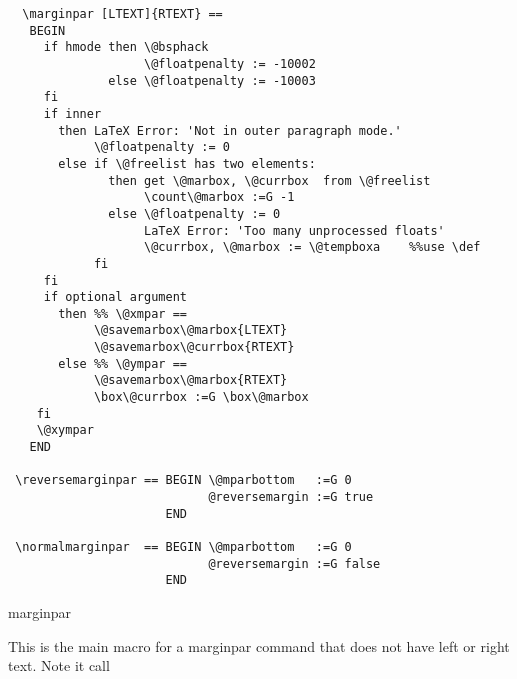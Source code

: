 \begin{verbatim}
  \marginpar [LTEXT]{RTEXT} ==
   BEGIN
     if hmode then \@bsphack
                   \@floatpenalty := -10002
              else \@floatpenalty := -10003
     fi
     if inner
       then LaTeX Error: 'Not in outer paragraph mode.'
            \@floatpenalty := 0
       else if \@freelist has two elements:
              then get \@marbox, \@currbox  from \@freelist
                   \count\@marbox :=G -1
              else \@floatpenalty := 0
                   LaTeX Error: 'Too many unprocessed floats'
                   \@currbox, \@marbox := \@tempboxa    %%use \def
            fi
     fi
     if optional argument
       then %% \@xmpar ==
            \@savemarbox\@marbox{LTEXT}
            \@savemarbox\@currbox{RTEXT}
       else %% \@ympar ==
            \@savemarbox\@marbox{RTEXT}
            \box\@currbox :=G \box\@marbox
    fi
    \@xympar 
   END

 \reversemarginpar == BEGIN \@mparbottom   :=G 0
                            @reversemargin :=G true
                      END

 \normalmarginpar  == BEGIN \@mparbottom   :=G 0
                            @reversemargin :=G false
                      END

\end{verbatim}




 \begin{docCommand}{marginpar}{}
    \begin{teX}
\def\marginpar{%
  \ifhmode
    \@bsphack
    \@floatpenalty -\@Mii
  \else
    \@floatpenalty-\@Miii
  \fi
  \ifinner
    \@parmoderr
    \@floatpenalty\z@
  \else
    \@next\@currbox\@freelist{}{}%
    \@next\@marbox\@freelist{\global\count\@marbox\m@ne}%
       {\@floatpenalty\z@
        \@fltovf\def\@currbox{\@tempboxa}\def\@marbox{\@tempboxa}}%
  \fi
  \@ifnextchar [\@xmpar\@ympar}
    \end{teX}
 \end{docCommand}


 \begin{macro}{\@xmpar}
    \begin{teX}
\long{}
    \end{teX}
 \end{macro}

This is the main macro for a marginpar command that does not have left or
right text. Note it call 
 \begin{macro}{\@ympar}
    \begin{teX}
\long{}
    \end{teX}
 \end{macro}
 
